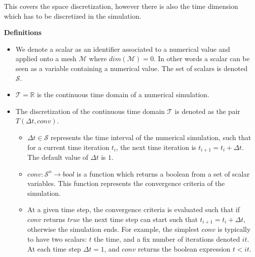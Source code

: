 \medskip
This covers the space discretization, however there is also the time dimension which has to be discretized in the simulation.

\medskip
\noindent \textbf{Definitions}
\begin{itemize}
\item We denote a scalar as an identifier associated to a numerical value and applied onto a mesh $\mathcal{M}$ where $dim(\mathcal{M})=0$. In other words a scalar can be seen as a variable containing a numerical value. The set of scalars is denoted $\mathcal{S}$.
\item $\mathcal{T}=\mathbb{R}$ is the continuous time domain of a numerical simulation.
\item The discretization of the continuous time domain $\mathcal{T}$ is denoted as the pair $T(\Delta t,conv)$.
\begin{itemize}
\item $\Delta t \in \mathcal{S}$ represents the time interval of the numerical simulation, such that for a current time iteration $t_i$, the next time iteration is $t_{i+1} = t_i + \Delta t$. The default value of $\Delta t$ is $1$.
\item $conv:\mathcal{S}^n \rightarrow bool$ is a function which returns a boolean from a set of scalar variables. This function represents the convergence criteria of the simulation. 
\item At a given time step, the convergence criteria is evaluated such that if $conv$ returns $true$ the next time step can start such that $t_{i+1} = t_i + \Delta t$, otherwise the simulation ends. For example, the simplest $conv$ is typically to have two scalars: $t$ the time, and a fix number of iterations denoted $it$. At each time step $\Delta t=1$, and $conv$ returns the boolean expression $t<it$.
\end{itemize}
\end{itemize}


